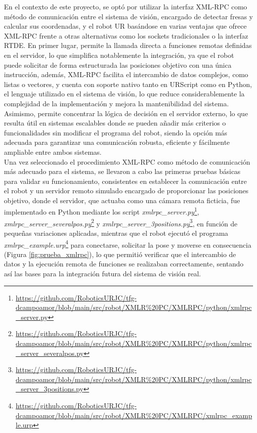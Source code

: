 En el contexto de este proyecto, se optó por utilizar la interfaz XML-RPC como método de comunicación entre el sistema de visión, encargado de detectar fresas y calcular sus coordenadas, y el robot UR basándose en varias ventajas que ofrece XML-RPC frente a otras alternativas como los sockets tradicionales o la interfaz RTDE. En primer lugar, permite la llamada directa a funciones remotas definidas en el servidor, lo que simplifica notablemente la integración, ya que el robot puede solicitar de forma estructurada las posiciones objetivo con una única instrucción, además, XML-RPC facilita el intercambio de datos complejos, como listas o vectores, y cuenta con soporte nativo tanto en URScript como en Python, el lenguaje utilizado en el sistema de visión, lo que reduce considerablemente la complejidad de la implementación y mejora la mantenibilidad del sistema. Asimismo, permite concentrar la lógica de decisión en el servidor externo, lo que resulta útil en sistemas escalables donde se pueden añadir más criterios o funcionalidades sin modificar el programa del robot, siendo la opción más adecuada para garantizar una comunicación robusta, eficiente y fácilmente ampliable entre ambos sistemas.\\

Una vez seleccionado el procedimiento XML-RPC como método de comunicación más adecuado para el sistema, se llevaron a cabo las primeras pruebas básicas para validar su funcionamiento, consistentes en establecer la comunicación entre el robot y un servidor remoto simulado encargado de proporcionar las posiciones objetivo, donde el servidor, que actuaba como una cámara remota ficticia, fue implementado en Python mediante los script \textit{xmlrpc\_server.py}\footnote{\url{https://github.com/RoboticsURJC/tfg-dcampoamor/blob/main/src/robot/XMLR\%20PC/XMLRPC/python/xmlrpc_server.py}}, \textit{xmlrpc\_server\_severalpos.py}\footnote{\url{https://github.com/RoboticsURJC/tfg-dcampoamor/blob/main/src/robot/XMLR\%20PC/XMLRPC/python/xmlrpc_server_severalpos.py}} y \textit{xmlrpc\_server\_3positions.py}\footnote{\url{https://github.com/RoboticsURJC/tfg-dcampoamor/blob/main/src/robot/XMLR\%20PC/XMLRPC/python/xmlrpc_server_3positions.py}}, en función de pequeñas variaciones aplicadas, mientras que el robot ejecutó el programa \textit{xmlrpc\_example.urp}\footnote{\url{https://github.com/RoboticsURJC/tfg-dcampoamor/blob/main/src/robot/XMLR\%20PC/XMLRPC/xmlrpc_example.urp}} para conectarse, solicitar la pose y moverse en consecuencia (Figura \ref{fig:prueba_xmlrpc}), lo que permitió verificar que el intercambio de datos y la ejecución remota de funciones se realizaban correctamente, sentando así las bases para la integración futura del sistema de visión real.

